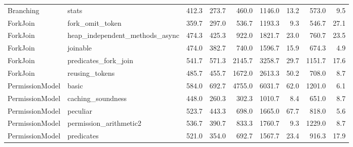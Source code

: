 \begin{sidewaystable}
\begin{tabular}{l l || r r r | r r | r r}
Branching & stats & 412.3 & 273.7 & 460.0 & 1146.0 & 13.2 & 573.0 & 9.5\\ 
ForkJoin & fork_omit_token & 359.7 & 297.0 & 536.7 & 1193.3 & 9.3 & 546.7 & 27.1\\ 
ForkJoin & heap_independent_methods_async & 474.3 & 425.3 & 922.0 & 1821.7 & 23.0 & 760.7 & 23.5\\ 
ForkJoin & joinable & 474.0 & 382.7 & 740.0 & 1596.7 & 15.9 & 674.3 & 4.9\\ 
ForkJoin & predicates_fork_join & 541.7 & 571.3 & 2145.7 & 3258.7 & 29.7 & 1151.7 & 17.6\\ 
ForkJoin & reusing_tokens & 485.7 & 455.7 & 1672.0 & 2613.3 & 50.2 & 708.0 & 8.7\\ 
PermissionModel & basic & 584.0 & 692.7 & 4755.0 & 6031.7 & 62.0 & 1201.0 & 6.1\\ 
PermissionModel & caching_soundness & 448.0 & 260.3 & 302.3 & 1010.7 & 8.4 & 651.0 & 8.7\\ 
PermissionModel & peculiar & 523.7 & 443.3 & 698.0 & 1665.0 & 67.7 & 818.0 & 5.6\\ 
PermissionModel & permission_arithmetic2 & 536.7 & 390.7 & 833.3 & 1760.7 & 9.3 & 1229.0 & 8.7\\ 
PermissionModel & predicates & 521.0 & 354.0 & 692.7 & 1567.7 & 23.4 & 916.3 & 17.9 \\
\end{tabular}
\end{sidewaystable}

